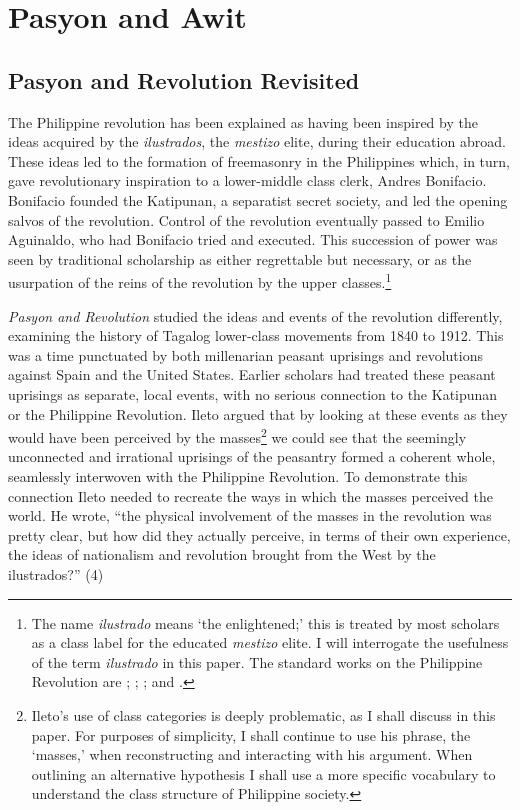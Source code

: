 \section{Pasyon and Awit}

\subsection{Pasyon and Revolution Revisited}

The Philippine revolution has been explained as having been inspired by the ideas acquired by the \textit{ilustrados}, the \textit{mestizo} elite, during their education abroad. These ideas led to the formation of freemasonry in the Philippines which, in turn, gave revolutionary inspiration to a lower-middle class clerk, Andres Bonifacio. Bonifacio founded the Katipunan, a separatist secret society, and led the opening salvos of the revolution. Control of the revolution eventually passed to Emilio Aguinaldo, who had Bonifacio tried and executed. This succession of power was seen by traditional scholarship as either regrettable but necessary, or as the usurpation of the reins of the revolution by the upper classes.\footnote{The name \textit{ilustrado} means \enquote*{the enlightened;} this is treated by most scholars as a class label for the educated \textit{mestizo} elite. I will interrogate the usefulness of the term \textit{ilustrado} in this paper. The standard works on the Philippine Revolution are \cite{Agoncillo1956}; \cite{Agoncillo1960}; \cite{Kalaw1969}; and \cite{Zaide1939}.}

\textit{Pasyon and Revolution} studied the ideas and events of the revolution differently, examining the history of Tagalog lower-class movements from 1840 to 1912. This was a time punctuated by both millenarian peasant uprisings and revolutions against Spain and the United States. Earlier scholars had treated these peasant uprisings as separate, local events, with no serious connection to the Katipunan or the Philippine Revolution. Ileto argued that by looking at these events as they would have been perceived by the masses\footnote{Ileto's use of class categories is deeply problematic, as I shall discuss in this paper. For purposes of simplicity, I shall continue to use his phrase, the \enquote*{masses,} when reconstructing and interacting with his argument. When outlining an alternative hypothesis I shall use a more specific vocabulary to understand the class structure of Philippine society.} we could see that the seemingly unconnected and irrational uprisings of the peasantry formed a coherent whole, seamlessly interwoven with the Philippine Revolution. To demonstrate this connection Ileto needed to recreate the ways in which the masses perceived the world. He wrote, \enquote{the physical involvement of the masses in the revolution was pretty clear, but how did they actually perceive, in terms of their own experience, the ideas of nationalism and revolution brought from the West by the ilustrados?} (4)

